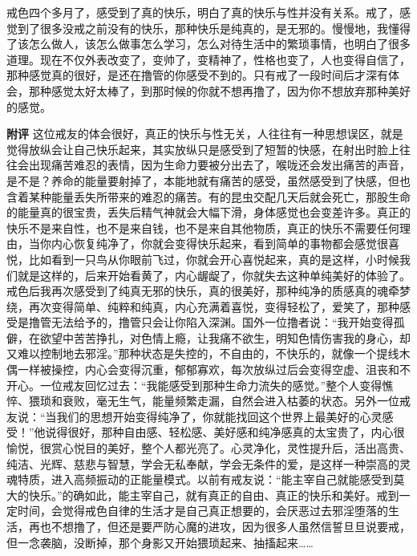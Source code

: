 \begin{case}
    戒色四个多月了，感受到了真的快乐，明白了真的快乐与性并没有关系。戒了，感觉到了很多没戒之前没有的快乐，那种快乐是纯真的，是无邪的。慢慢地，我懂得了该怎么做人，该怎么做事怎么学习，怎么对待生活中的繁琐事情，也明白了很多道理。现在不仅外表改变了，变帅了，变精神了，性格也变了，人也变得自信了，那种感觉真的很好，是还在撸管的你感受不到的。只有戒了一段时间后才深有体会，那种感觉太好太棒了，到那时候的你就不想再撸了，因为你不想放弃那种美好的感觉。

    \textbf{附评} 这位戒友的体会很好，真正的快乐与性无关，人往往有一种思想误区，就是觉得放纵会让自己快乐起来，其实放纵只是感受到了短暂的快感，在射出时脸上往往会出现痛苦难忍的表情，因为生命力要被分出去了，喉咙还会发出痛苦的声音，是不是？养命的能量要射掉了，本能地就有痛苦的感受，虽然感受到了快感，但也含着某种能量丢失所带来的难忍的痛苦。有的昆虫交配几天后就会死亡，那股生命的能量真的很宝贵，丢失后精气神就会大幅下滑，身体感觉也会变差许多。真正的快乐不是来自性，也不是来自钱，也不是来自其他物质，真正的快乐不需要任何理由，当你内心恢复纯净了，你就会变得快乐起来，看到简单的事物都会感觉很喜悦，比如看到一只鸟从你眼前飞过，你就会开心喜悦起来，真的是这样，小时候我们就是这样的，后来开始看黄了，内心龌龊了，你就失去这种单纯美好的体验了。戒色后我再次感受到了纯真无邪的快乐，真的很美好，那种纯净的质感真的魂牵梦绕，再次变得简单、纯粹和纯真，内心充满着喜悦，变得轻松了，爱笑了，那种感受是撸管无法给予的，撸管只会让你陷入深渊。国外一位撸者说：“我开始变得孤僻，在欲望中苦苦挣扎，对色情上瘾，让我痛不欲生，明知色情伤害我的身心，却又难以控制地去邪淫。”那种状态是失控的，不自由的，不快乐的，就像一个提线木偶一样被操控，内心会变得沉重，郁郁寡欢，每次放纵过后会变得空虚、沮丧和不开心。一位戒友回忆过去：“我能感受到那种生命力流失的感觉。”整个人变得憔悴、猥琐和衰败，毫无生气，能量频繁走漏，自然会进入枯萎的状态。另外一位戒友说：“当我们的思想开始变得纯净了，你就能找回这个世界上最美好的心灵感受！”他说得很好，那种自由感、轻松感、美好感和纯净感真的太宝贵了，内心很愉悦，很赏心悦目的美好，整个人都光亮了。心灵净化，灵性提升后，活出高贵、纯洁、光辉、慈悲与智慧，学会无私奉献，学会无条件的爱，是这样一种崇高的灵魂特质，进入高频振动的正能量模式。以前有戒友说：“能主宰自己就能感受到莫大的快乐。”的确如此，能主宰自己，就有真正的自由、真正的快乐和美好。戒到一定时间，会觉得戒色自律的生活才是自己真正想要的，会厌恶过去邪淫堕落的生活，再也不想撸了，但还是要严防心魔的进攻，因为很多人虽然信誓旦旦说要戒，但一念袭脑，没断掉，那个身影又开始猥琐起来、抽搐起来……
\end{case}

